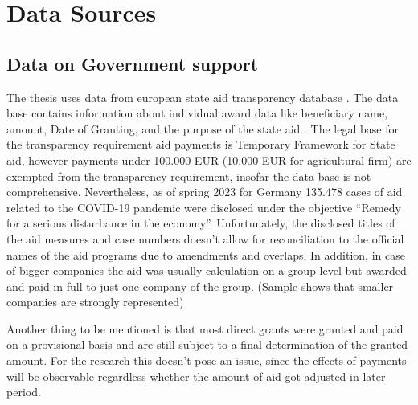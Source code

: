 
\chapter{Data Sources} %

\label{Chapter3} %


\section{Data on Government support}

The thesis uses data from european state aid transparency database \parencite{eu_com_state_2023}. The data base contains information about individual award data like beneficiary name, amount, Date of Granting, and the purpose of the state aid \parencite{eu_com_state_2023}. The legal base for the transparency requirement aid payments is Temporary Framework for State aid, however payments under 100.000 EUR (10.000 EUR for agricultural firm) are exempted from the transparency requirement, insofar the data base is not comprehensive. Nevertheless, as of spring 2023 for Germany 135.478 cases of aid related to the COVID-19 pandemic were disclosed under the objective “Remedy for a serious disturbance in the economy”. Unfortunately, the disclosed titles of the aid measures and case numbers doesn’t allow for reconciliation to the official names of the aid programs due to amendments and overlaps. In addition, in case of bigger companies the aid was usually calculation on a group level but awarded and paid in full to just one company of the group. (Sample shows that smaller companies are strongly represented)

Another thing to be mentioned is that most direct grants were granted and paid on a provisional basis and are still subject to a final determination of the granted amount. For the research this doesn’t pose an issue, since the effects of payments will be observable regardless whether the amount of aid got adjusted in later period. 






